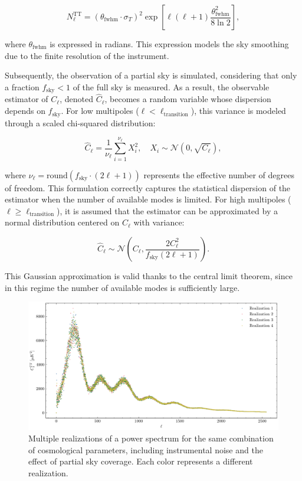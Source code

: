\begin{equation}
N_\ell^{\mathrm{TT}} = \left(\theta_{\text{fwhm}} \cdot \sigma_T \right)^2 \exp\left[ \ell (\ell + 1) \frac{\theta_{\text{fwhm}}^2}{8 \ln 2} \right],
\end{equation}

where \(\theta_{\text{fwhm}}\) is expressed in radians. This expression models the sky smoothing due to the finite resolution of the instrument.

Subsequently, the observation of a partial sky is simulated, considering that only a fraction \(f_{\text{sky}} < 1\) of the full sky is measured. As a result, the observable estimator of \(C_\ell\), denoted \(\hat{C}_\ell\), becomes a random variable whose dispersion depends on \(f_{\text{sky}}\). For low multipoles (\(\ell < \ell_{\text{transition}}\)), this variance is modeled through a scaled chi-squared distribution:

\begin{equation}
\hat{C}_\ell = \frac{1}{\nu_\ell} \sum_{i=1}^{\nu_\ell} X_i^2, \quad X_i \sim \mathcal{N}(0, \sqrt{C_\ell}),
\end{equation}

where \(\nu_\ell = \text{round}(f_{\text{sky}} \cdot (2\ell + 1))\) represents the effective number of degrees of freedom. This formulation correctly captures the statistical dispersion of the estimator when the number of available modes is limited. For high multipoles (\(\ell \geq \ell_{\text{transition}}\)), it is assumed that the estimator can be approximated by a normal distribution centered on \(C_\ell\) with variance:

\begin{equation}
\hat{C}_\ell \sim \mathcal{N}\left(C_\ell, \frac{2 C_\ell^2}{f_{\text{sky}} (2\ell + 1)} \right).
\end{equation}

This Gaussian approximation is valid thanks to the central limit theorem, since in this regime the number of available modes is sufficiently large.

\begin{figure}
    \centering
    \includegraphics[scale=0.41]{img/grafico.pdf}
    \caption{Multiple realizations of a power spectrum for the same combination of cosmological parameters, including instrumental noise and the effect of partial sky coverage. Each color represents a different realization.}
    \label{fig:realizations_noise}
\end{figure}

